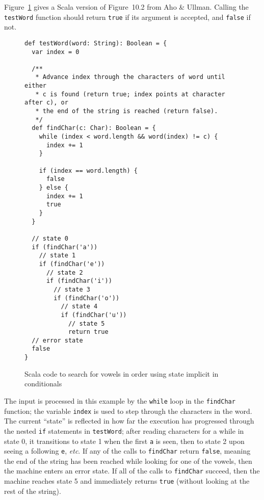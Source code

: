 Figure~\ref{fig:vowelsimplicit} gives a Scala version of Figure~10.2 from Aho \& Ullman. Calling the \verb|testWord| function should return \verb|true| if its argument is accepted, and \verb|false| if not.
\begin{figure}
\begin{verbatim}
def testWord(word: String): Boolean = {
  var index = 0
  
  /**
   * Advance index through the characters of word until either
   * c is found (return true; index points at character after c), or
   * the end of the string is reached (return false).
   */
  def findChar(c: Char): Boolean = {
    while (index < word.length && word(index) != c) {
      index += 1
    }
    
    if (index == word.length) {
      false
    } else {
      index += 1
      true
    }
  }
  
  // state 0
  if (findChar('a'))
    // state 1
    if (findChar('e'))
      // state 2
      if (findChar('i'))
        // state 3
        if (findChar('o'))
          // state 4
          if (findChar('u'))
            // state 5
            return true
  // error state
  false
}
\end{verbatim}
\caption{Scala code to search for vowels in order using state implicit in conditionals}
\label{fig:vowelsimplicit}
\end{figure}

The input is processed in this example by the \verb|while| loop in the \verb|findChar|
function; the variable \verb|index| is used to step through the characters in the word.
The current ``state'' is reflected in how far the execution has progressed through
the nested \verb|if| statements in \verb|testWord|; after reading characters for a while in
state 0, it transitions to state 1 when the first \verb|a| is seen, then to state 2 upon
seeing a following \verb|e|, \textit{etc}. If any of the calls to \verb|findChar| return \verb|false|, meaning
the end of the string has been reached while looking for one of the vowels, then the
machine enters an error state. If all of the calls to \verb|findChar| succeed, then the
machine reaches state 5 and immediately returns \verb|true| (without looking at the rest
of the string).

